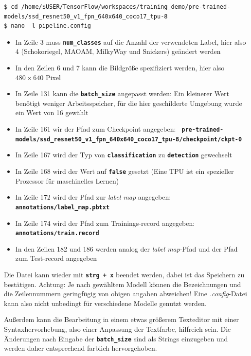 \documentclass[12pt, oneside]{article}
\begin{document}
\begin{verbatim}
$ cd /home/$USER/TensorFlow/workspaces/training_demo/pre-trained-models/ssd_resnet50_v1_fpn_640x640_coco17_tpu-8
$ nano -l pipeline.config
\end{verbatim}
\begin{itemize}
	\item In Zeile 3 muss \textbf{\texttt{num\_classes}} auf die Anzahl der verwendeten Label, hier also 4 (Schokoriegel, MAOAM, MilkyWay und Snickers) geändert werden
	\item In den Zeilen 6 und 7 kann die Bildgröße spezifiziert werden, hier also $480\times640$ Pixel
	\item In Zeile 131 kann die \textbf{\texttt{batch\_size}} angepasst werden: Ein kleinerer Wert benötigt weniger Arbeitsspeicher, für die hier geschilderte Umgebung wurde ein Wert von 16 gewählt
	\item In Zeile 161 wir der Pfad zum Checkpoint angegeben: \textbf{\texttt{ pre-trained-models/ssd\linebreak\_resnet50\_v1\_fpn\_640x640\_coco17\_tpu-8/checkpoint/ckpt-0}}
	\item In Zeile 167 wird der Typ von \textbf{\texttt{classification}} zu \textbf{\texttt{detection}} gewechselt
	\item In Zeile 168 wird der Wert auf \textbf{\texttt{false}} gesetzt (Eine TPU ist ein spezieller Prozessor für maschinelles Lernen)
	\item In Zeile 172 wird der Pfad zur \textit{label map} angegeben: \textbf{\texttt{annotations/\linebreak label\_map.pbtxt}}
	\item In Zeile 174 wird der Pfad zum Trainings-record angegeben: \textbf{\texttt{annotations/\linebreak train.record}}
	\item In den Zeilen 182 und 186 werden analog der \textit{label map}-Pfad und der Pfad zum Test-record angegeben
\end{itemize}
Die Datei kann wieder mit \textbf{\texttt{strg + x}} beendet werden, dabei ist das Speichern zu bestätigen. Achtung: Je nach gewähltem Modell können die Bezeichnungen und die Zeilennummern geringfügig von obigen angaben abweichen! Eine \textit{.config}-Datei kann also nicht unbedingt für verschiedene Modelle genutzt werden.

Außerdem kann die Bearbeitung in einem etwas größerem Texteditor mit einer Syntaxhervorhebung, also einer Anpassung der Textfarbe, hilfreich sein. Die Änderungen nach Eingabe der \textbf{\texttt{batch\_size}} sind als Strings einzugeben und werden daher entsprechend farblich hervorgehoben.\\
\end{document}
